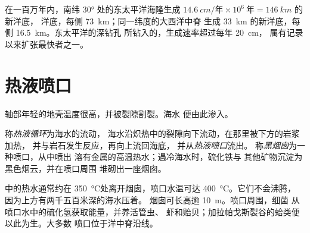 \begin{example}[慢速洋脊与快速洋脊]\label{ex:g11:ocean-ridges:rates}
在一百万年内，南纬 \ang{30} 处的东太平洋海隆生成
$\qty{14.6}{cm/\text{年}} \times 10^6\ \text{年} = \qty{146}{km}$ 的新洋底，
洋底，每侧 \qty{73}{km}；同一纬度的大西洋中脊
生成 \qty{33}{km} 的新洋底，每侧 \qty{16.5}{km}。东太平洋的深钻孔
所钻入的，生成速率超过每年 \qty{20}{cm}，
属有记录以来扩张最快者之一。
\end{example}

\section{热液喷口}

轴部年轻的地壳温度很高，并被裂隙割裂。海水
便由此渗入。

\begin{definition}\label{def:g11:ocean-ridges:hydrothermal}
称\emph{热液循环}为海水的流动，
海水沿炽热中的裂隙向下流动，在那里被下方的岩浆加热，
并与岩石发生反应，再向上流回海底，
并从\emph{热液喷口}流出。
称\emph{黑烟囱}为一种喷口，从中喷出
溶有金属的高温热水；遇冷海水时，硫化铁与
其他矿物沉淀为黑色烟云，并在喷口周围
堆砌出一座烟囱。
\end{definition}

中的热水通常约在
\qty{350}{\celsius}处离开烟囱，喷口水温可达 \qty{400}{\celsius}。它们不会沸腾，
因为上方有两千五百米深的海水压着。
烟囱可长高逾 \qty{10}{m}。喷口周围，细菌
从喷口水中的硫化氢获取能量，并养活管虫、
虾和贻贝；加拉帕戈斯裂谷的蛤类便以此为生。大多数
喷口位于洋中脊沿线。

